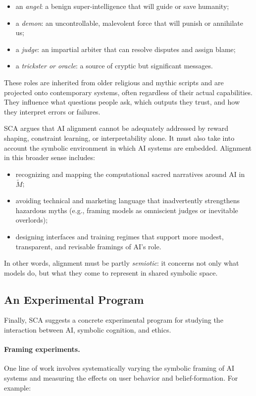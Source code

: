 \documentclass[12]{amsart}
\theoremstyle{plain}
\begin{document}
\begin{itemize}
  \item an \emph{angel}: a benign super-intelligence that will guide or save humanity;
  \item a \emph{demon}: an uncontrollable, malevolent force that will punish or annihilate us;
  \item a \emph{judge}: an impartial arbiter that can resolve disputes and assign blame;
  \item a \emph{trickster or oracle}: a source of cryptic but significant messages.
\end{itemize}

These roles are inherited from older religious and mythic scripts and are projected onto contemporary systems, often regardless of their actual capabilities. They influence what questions people ask, which outputs they trust, and how they interpret errors or failures.

SCA argues that AI alignment cannot be adequately addressed by reward shaping, constraint learning, or interpretability alone. It must also take into account the symbolic environment in which AI systems are embedded. Alignment in this broader sense includes:

\begin{itemize}
  \item recognizing and mapping the computational sacred narratives around AI in $\tilde M$;
  \item avoiding technical and marketing language that inadvertently strengthens hazardous myths (e.g., framing models as omniscient judges or inevitable overlords);
  \item designing interfaces and training regimes that support more modest, transparent, and revisable framings of AI's role.
\end{itemize}

In other words, alignment must be partly \emph{semiotic}: it concerns not only what models do, but what they come to represent in shared symbolic space.

\subsection{An Experimental Program}

Finally, SCA suggests a concrete experimental program for studying the interaction between AI, symbolic cognition, and ethics.

\paragraph{Framing experiments.} One line of work involves systematically varying the symbolic framing of AI systems and measuring the effects on user behavior and belief-formation. For example:
\end{document}
